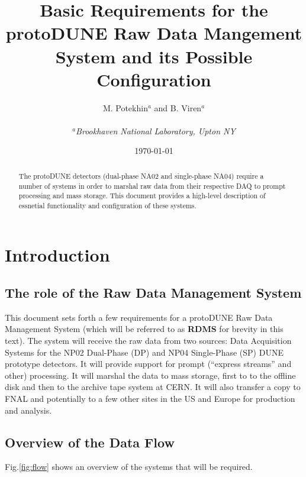 \documentclass[pdftex,12pt,letter]{article}
\title{Basic Requirements for the protoDUNE Raw Data Mangement System and its Possible Configuration}
\date{\today}
\author{M. Potekhin$^a$ and B. Viren$^a$\\
\ \\
$^a$\textit{Brookhaven National Laboratory, Upton NY}
}
\begin{document}
\maketitle

\begin{abstract}
The protoDUNE detectors (dual-phase NA02 and single-phase NA04)
require a number of systems in order to marshal raw data from
their respective DAQ to prompt processing and mass storage.  This
document provides a high-level description of essnetial functionality and
configuration of these systems.
\end{abstract}
\pagebreak
\tableofcontents

\pagebreak

\section{Introduction}
\subsection{The role of the Raw Data Management System}
This document sets forth a few requirements for a protoDUNE Raw Data Management System
(which will be referred to as \textbf{RDMS} for brevity in this text).  The system will receive the raw data from
two sources: Data Acquisition Systems for the NP02 Dual-Phase (DP) and NP04 Single-Phase (SP) DUNE prototype detectors.
It will provide support for prompt (``express streams'' and other) processing.  It will marshal the data to mass storage, first
to to the offline disk and then to the archive tape system at CERN. It will also transfer a copy to FNAL and potentially
to a few other sites in the US and Europe for production and analysis.

\subsection{Overview of the Data Flow}
Fig.\ref{fig:flow} shows an overview of the systems that will be required.
\end{document}
